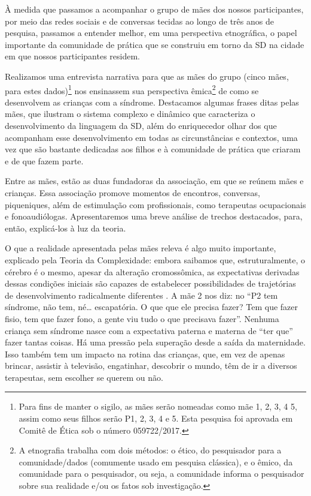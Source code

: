 \documentclass[output=paper,colorlinks,citecolor=brown,booklanguage=portuguese]{langscibook}
\begin{document}
À medida que passamos a acompanhar o grupo de mães dos nossos participantes, por meio das redes sociais e de conversas tecidas ao longo de três anos de pesquisa, passamos a entender melhor, em uma perspectiva etnográfica, o papel importante da comunidade de prática que se construiu em torno da SD na cidade em que nossos participantes residem.

Realizamos uma entrevista narrativa para que as mães do grupo (cinco mães, para estes dados)\footnote{Para fins de manter o sigilo, as mães serão nomeadas como mãe 1, 2, 3, 4 5, assim como seus filhos serão P1, 2, 3, 4 e 5. Esta pesquisa foi aprovada em Comitê de Ética sob o número 059722/2017.} nos ensinassem sua perspectiva êmica\footnote{A etnografia trabalha com dois métodos: o ético, do pesquisador para a comunidade/dados (comumente usado em pesquisa clássica), e o êmico, da comunidade para o pesquisador, ou seja, a comunidade informa o pesquisador sobre sua realidade e/ou os fatos sob investigação.} de como se desenvolvem as crianças com a síndrome. Destacamos algumas frases ditas pelas mães, que ilustram o sistema complexo e dinâmico que caracteriza o desenvolvimento da linguagem da SD, além do enriquecedor olhar dos que acompanham esse desenvolvimento em todas as circunstâncias e contextos, uma vez que são bastante dedicadas aos filhos e à comunidade de prática que criaram e de que fazem parte.

Entre as mães, estão as duas fundadoras da associação, em que se reúnem mães e crianças. Essa associação promove momentos de encontros, conversas, piqueniques, além de estimulação com profissionais, como terapeutas ocupacionais e fonoaudiólogas. Apresentaremos uma breve análise de trechos destacados, para, então, explicá-los à luz da teoria.

O que a realidade apresentada pelas mães releva é algo muito importante, explicado pela Teoria da Complexidade: embora saibamos que, estruturalmente, o cérebro é o mesmo, apesar da alteração cromossômica, as expectativas derivadas dessas condições iniciais são capazes de estabelecer possibilidades de trajetórias de desenvolvimento radicalmente diferentes \citep{KarmiloffSmith1998, KarmiloffSmith2016}. A mãe 2 nos diz: no “P2 tem síndrome, não tem, né… escapatória. O que que ele precisa fazer? Tem que fazer fisio, tem que fazer fono, a gente viu tudo o que precisava fazer”. Nenhuma criança sem síndrome nasce com a expectativa paterna e materna de “ter que” fazer tantas coisas. Há uma pressão pela superação desde a saída da maternidade. Isso também tem um impacto na rotina das crianças, que, em vez de apenas brincar, assistir à televisão, engatinhar, descobrir o mundo, têm de ir a diversos terapeutas, sem escolher se querem ou não.
\end{document}
